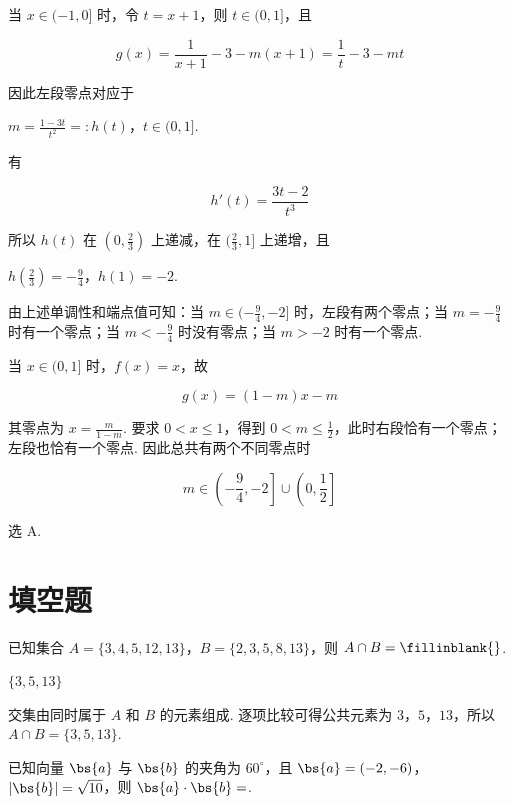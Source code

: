 \begin{solution}
当 \(x\in(-1,0]\) 时，令 \(t=x+1\)，则 \(t\in(0,1]\)，且

\[
g(x)=\frac1{x+1}-3-m(x+1)=\frac1t-3-mt
\]

因此左段零点对应于

\(m=\frac{1-3t}{t^2}=:h(t)\)，\(t\in(0,1]\).

有

\[
h'(t)=\frac{3t-2}{t^3}
\]

所以 \(h(t)\) 在 \((0,\frac23)\) 上递减，在 \((\frac23,1]\) 上递增，且

\(h\left(\frac23\right)=-\frac94\)，\(h(1)=-2\).

由上述单调性和端点值可知：当 \(m\in(-\frac94,-2]\) 时，左段有两个零点；当 \(m=-\frac94\) 时有一个零点；当 \(m<-\frac94\) 时没有零点；当 \(m>-2\) 时有一个零点.

当 \(x\in(0,1]\) 时，\(f(x)=x\)，故

\[
g(x)=(1-m)x-m
\]

其零点为 \(x=\frac{m}{1-m}\). 要求 \(0<x\leqslant1\)，得到 \(0<m\leqslant\frac12\)，此时右段恰有一个零点；左段也恰有一个零点. 因此总共有两个不同零点时

\[
m\in\left(-\frac94,-2\right]\cup\left(0,\frac12\right]
\]

选 A.
\end{solution}

\section{填空题}

\begin{problem}
已知集合 \(A = \{3, 4, 5, 12, 13\}\)，\(B = \{2, 3, 5, 8, 13\}\)，则 \(A \cap B =\fillinblank{}\).
\end{problem}

\begin{answer}
\(\{3,5,13\}\)
\end{answer}

\begin{solution}
交集由同时属于 \(A\) 和 \(B\) 的元素组成. 逐项比较可得公共元素为 \(3\)，\(5\)，\(13\)，所以 \(A\cap B=\{3,5,13\}\).
\end{solution}

\begin{problem}
已知向量 \(\bs{a}\) 与 \(\bs{b}\) 的夹角为 \( 60^{\circ} \)，且 \(\bs{a} = (-2, -6)\)，\(|\bs{b}| = \sqrt{10}\)，则 \(\bs{a} \cdot \bs{b} =\)\fillinblank{}.
\end{problem}

